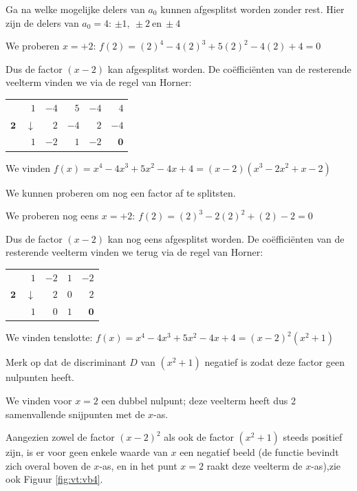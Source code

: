 Ga na welke mogelijke delers van $a_{0}$ kunnen afgesplitst
worden zonder rest. Hier zijn de delers van $a_{0}=4$: $\pm1,\:\pm2\:\textrm{en}\:\pm4$

We proberen $x=+2$: $f(2)=(2)^{4}-4(2)^{3}+5(2)^{2}-4(2)+4=0$

Dus de factor $(x-2)$ kan afgesplitst worden. De co\"effici\"enten
van de resterende veelterm vinden we via de regel van Horner:

\begin{center}
\begin{tabular}{r||rrrrr}
	& $1$ & $-4$ & $5$ & $-4$ & $4$\\
	$\mathbf{2}$ & $\downarrow$ & $2$ & $-4$ & $2$ & $-4$\\
	\hline  
	& $1$ & $-2$ & $1$ & \multicolumn{1}{r|}{$-2$} & $\mathbf{0}$\\
\end{tabular}	
\end{center}

We vinden $f(x)=x^{4}-4x^{3}+5x^{2}-4x+4=(x-2)(x^{3}-2x^{2}+x-2)$

We kunnen proberen om nog een factor af te splitsten.

We proberen nog eens $x=+2$: $f(2)=(2)^{3}-2(2)^{2}+(2)-2=0$

Dus de factor $(x-2)$ kan nog eens afgesplitst worden.
De co\"effici\"enten van de resterende veelterm vinden we terug via de
regel van Horner:

\begin{center}
\begin{tabular}{r||rrrr}
	& $1$ & $-2$ & $1$ & $-2$\\
	$\mathbf{2}$ & $\downarrow$ & $2$ & $0$ & $2$\\
	\hline 
	& $1$ & $0$ & \multicolumn{1}{r|}{$1$} & $\mathbf{0}$\\
\end{tabular}
\end{center}

We vinden tenslotte: $f(x)=x^{4}-4x^{3}+5x^{2}-4x+4=(x-2)^{2}(x^{2}+1)$

Merk op dat de discriminant $D$ van $(x^{2}+1)$ negatief
is zodat deze factor geen nulpunten heeft.

We vinden voor $x=2$ een dubbel nulpunt; deze veelterm
heeft dus 2 samenvallende snijpunten met de $x$-as.

Aangezien zowel de factor $(x-2)^{2}$ als ook de factor
$(x^{2}+1)$ steeds positief zijn, is er voor geen enkele waarde van
$x$ een negatief beeld (de functie bevindt zich overal boven de $x$-as,
en in het punt $x=2$ raakt deze veelterm de $x$-as),zie ook Figuur \ref{fig:vt:vb4}.

